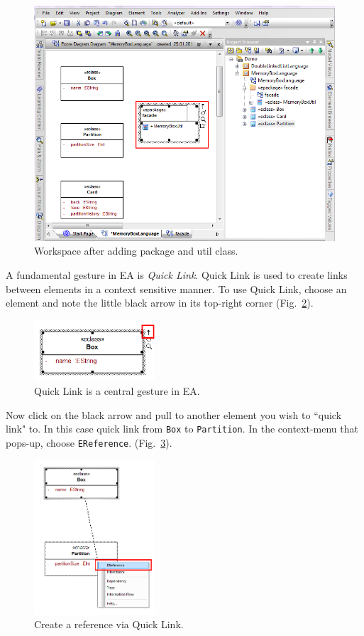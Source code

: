 \begin{figure}[htbp]
	\centering
  \includegraphics[width=.8\textwidth]{pics/memBoxBilder/memBox22.png}
	\caption{Workspace after adding package and util class.}
	\label{fig:epackage_completed}
\end{figure}

A fundamental gesture in EA is \emph{Quick Link}.  Quick Link is used to create
links between elements in a context sensitive manner.  To use Quick Link,
choose an element and note the little black arrow in its top-right corner
(Fig.~\ref{fig:quicklink}). 

\begin{figure}[htbp]
	\centering
  \includegraphics[width=0.4\textwidth]{pics/memBoxBilder/memBox23.png}
	\caption{Quick Link is a central gesture in EA.} 
	\label{fig:quicklink}
\end{figure}

\clearpage 

Now click on the black arrow and pull to another element you wish to ``quick
link" to.  In this case quick link from \texttt{Box} to \texttt{Partition}.  In
the context-menu that pops-up, choose \texttt{EReference}.
(Fig.~\ref{fig:ereference}). 

\begin{figure}[htbp] 
	\centering
  \includegraphics[width=0.4\textwidth]{pics/memBoxBilder/memBox24.png}
	\caption{Create a reference via Quick Link.}
	\label{fig:ereference}
\end{figure}

